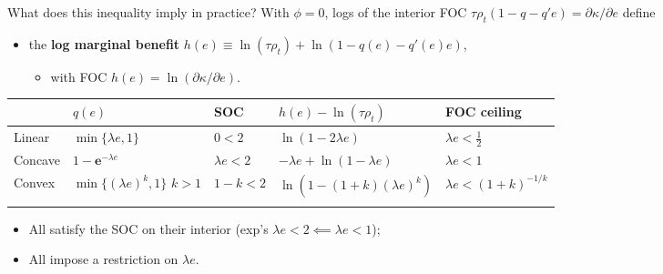 \documentclass[
  ignorenonframetext,
  aspectratio=169,
]{beamer}
\newcounter{none} %
\providecommand{\tightlist}{%
  \setlength{\itemsep}{0pt}\setlength{\parskip}{0pt}}
\begin{document}
\begin{frame}{What does this inequality imply in practice?}
\protect{}\label{what-does-this-inequality-imply-in-practice}
With \(\phi=0\), logs of the interior FOC
\(\tau\rho_t(1-q-q'e)=\partial\kappa/\partial e\) define

\begin{itemize}
\tightlist
\item
  the \textbf{log marginal benefit}
  \(h(e)\equiv\ln(\tau\rho_t)+\ln(1-q(e)-q'(e)e)\),

  \begin{itemize}
  \tightlist
  \item
    with FOC \(h(e)=\ln(\partial\kappa/\partial e)\).
  \end{itemize}
\end{itemize}

{\def\LTcaptype{none} %
\begin{longtable}[]{@{}
  >{\raggedright\arraybackslash}p{}
  >{\centering\arraybackslash}p{}
  >{\centering\arraybackslash}p{}
  >{\centering\arraybackslash}p{}
  >{\centering\arraybackslash}p{}@{}}
\toprule\noalign{}
\begin{minipage}[b]{\linewidth}\raggedright
\end{minipage} & \begin{minipage}[b]{\linewidth}\centering
\(q(e)\)
\end{minipage} & \begin{minipage}[b]{\linewidth}\centering
SOC
\end{minipage} & \begin{minipage}[b]{\linewidth}\centering
\(h(e)-\ln(\tau\rho_t)\)
\end{minipage} & \begin{minipage}[b]{\linewidth}\centering
FOC ceiling
\end{minipage} \\
\midrule\noalign{}
\endhead
Linear & \(\min\{\lambda e,1\}\) & \(0<2\) & \(\ln(1-2\lambda e)\) &
\(\lambda e<\tfrac12\) \\
Concave & \(1-\textbf{e}^{-\lambda e}\) & \(\lambda e<2\) &
\(-\lambda e+\ln(1-\lambda e)\) & \(\lambda e<1\) \\
Convex & \(\min\{(\lambda e)^k,1\}\) \(k>1\) & \(1-k<2\) &
\(\ln(1-(1{+}k)(\lambda e)^k)\) & \(\lambda e<(1{+}k)^{-1/k}\) \\
\bottomrule\noalign{}
\end{longtable}
}

\begin{itemize}
\tightlist
\item
  All satisfy the SOC on their interior (exp's
  \(\lambda e<2 \impliedby \lambda e<1\));
\item
  All impose a restriction on \(\lambda e\).
\end{itemize}
\end{frame}
\end{document}
